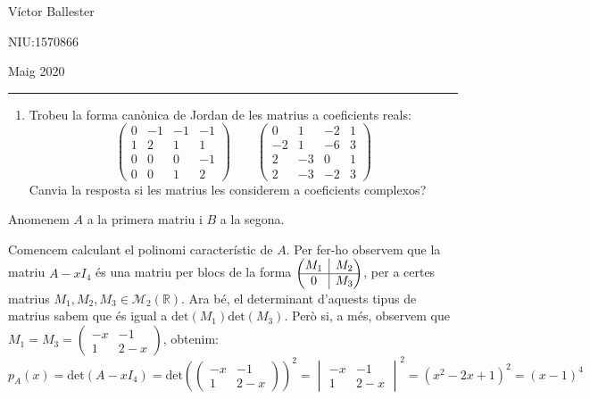 \documentclass[11pt,a4paper]{article}
\newcommand{\rvline}{\hspace*{-\arraycolsep}\vline\hspace*{-\arraycolsep}}
\begin{document}
\begin{flushright}
    Víctor Ballester\par NIU:1570866\par Maig 2020
\end{flushright}
\rule{180mm}{0.1mm}\par
\begin{enumerate}
    \item Trobeu la forma canònica de Jordan de les matrius a coeficients reals:
    \begin{equation*}
        \begin{pmatrix}
        0 & -1 & -1 & -1\\
        1 & 2 & 1 & 1\\
        0 & 0 & 0 & -1\\
        0 & 0 & 1 & 2
        \end{pmatrix}\qquad\begin{pmatrix}
        0 & 1 & -2 & 1\\
        -2 & 1 & -6 & 3\\
        2 & -3 & 0 & 1\\
        2 & -3 & -2 & 3
        \end{pmatrix}
    \end{equation*}
    Canvia la resposta si les matrius les considerem a coeficients complexos?
\end{enumerate}
Anomenem $A$ a la primera matriu i $B$ a la segona.\par
Comencem calculant el polinomi característic de $A$. Per fer-ho observem que la matriu $A-xI_4$ és una matriu per blocs de la forma $\begin{pmatrix}
    M_1 & \rvline & M_2\\
    \hline
    0 & \rvline &  M_3
    \end{pmatrix}$, per a certes matrius $M_1,M_2,M_3\in\mathcal{M}_2(\mathbb{R})$. Ara bé, el determinant d'aquests tipus de matrius sabem que és igual a $\text{det}(M_1)\text{det}(M_3)$. Però si, a més, observem que $M_1=M_3=\begin{pmatrix}
    -x & -1\\
    1 &  2-x
    \end{pmatrix}$, obtenim:
    \begin{equation*}
        p_A(x)=\text{det}(A-xI_4)=\text{det}\left(\begin{pmatrix}
    -x & -1\\
    1 &  2-x
    \end{pmatrix}\right)^2=\begin{vmatrix}
        -x & -1\\
        1 &  2-x
        \end{vmatrix}^2=(x^2-2x+1)^2=(x-1)^4
    \end{equation*}
\end{document}
